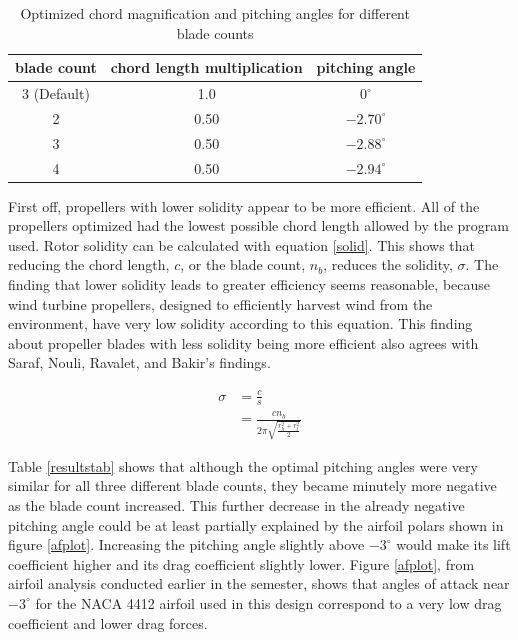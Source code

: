\documentclass[journal ]{new-aiaa}
\begin{document}
\begin{table}[H]
 \centering
 \begin{tabular}{| c | c | c |} \hline
 	 \textbf{blade count} & \textbf{chord length multiplication} & \textbf{pitching angle} \\ \hline
  	 3 (Default) & 1.0 & $0^{\circ}$ \\ \hline
  	 2 & 0.50 & $-2.70^{\circ}$ \\ \hline
  	 3 & 0.50 & $-2.88^{\circ}$ \\ \hline
  	 4 & 0.50 & $-2.94^{\circ}$ \\ \hline
 \end{tabular}
 \caption{Optimized chord magnification and pitching angles for different blade counts}
 \label{resultstab}
\end{table}

First off, propellers with lower solidity appear to be more efficient. All of the propellers optimized had the lowest possible chord length allowed by the program used. Rotor solidity can be calculated with equation \eqref{solid}. This shows that reducing the chord length, $c$, or the blade count, $n_{b}$, reduces the solidity, $\sigma$. The finding that lower solidity leads to greater efficiency seems reasonable, because wind turbine propellers, designed to efficiently harvest wind from the environment, have very low solidity according to this equation. This finding about propeller blades with less solidity being more efficient also agrees with Saraf, Nouli, Ravalet, and Bakir's findings\cite{AxFlFan}.

\begin{equation}
	\begin{aligned}
	\sigma & = \frac{c}{s} \\
	& = \frac{c n_{b}}{2 \pi \sqrt{\frac{r_{h}^{2}+r_{t}^{2}}{2}}}
\end{aligned}
\label{solid}
\end{equation}

Table \eqref{resultstab} shows that although the optimal pitching angles were very similar for all three different blade counts, they became minutely more negative as the blade count increased. This further decrease in the already negative pitching angle could be at least partially explained by the airfoil polars shown in figure \eqref{afplot}. Increasing the pitching angle slightly above $-3^{\circ}$ would make its lift coefficient higher and its drag coefficient slightly lower. Figure \eqref{afplot}, from airfoil analysis conducted earlier in the semester, shows that angles of attack near $-3^{\circ}$ for the NACA 4412 airfoil used in this design correspond to a very low drag coefficient and lower drag forces.
\end{document}
